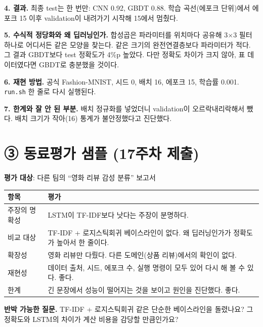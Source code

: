 \documentclass[11pt]{article}
\begin{document}
\noindent\textbf{4. 결과.} 최종 test는 한 번만: CNN 0.92, GBDT 0.88. 학습 곡선(에포크 단위)에서 에포크 15 이후 validation이 내려가기 시작해 15에서 멈췄다.

\noindent\textbf{5. 수식적 정당화와 왜 딥러닝인가.} 합성곱은 파라미터를 위치마다 공유해 3$\times$3 필터 하나로 어디서든 같은 모양을 찾는다. 같은 크기의 완전연결층보다 파라미터가 적다. 그 결과 GBDT보다 test 정확도가 4\%p 높았다. 다만 정확도 차이가 크지 않아, 표 데이터였다면 GBDT로 충분했을 것이다.

\noindent\textbf{6. 재현 방법.} 공식 Fashion-MNIST, 시드 0, 배치 16, 에포크 15, 학습률 0.001. \texttt{run.sh} 한 줄로 다시 실행된다.

\noindent\textbf{7. 한계와 잘 안 된 부분.} 배치 정규화를 넣었더니 validation이 오르락내리락해서 뺐다. 배치 크기가 작아(16) 통계가 불안정했다고 진단했다.

\newpage
\section*{③ 동료평가 샘플 (17주차 제출)}
\noindent\textbf{평가 대상}: 다른 팀의 ``영화 리뷰 감성 분류'' 보고서

\begin{center}\small
\begin{tabular}{@{}p{3.4cm}p{9cm}@{}}\toprule
항목 & 평가 \\\midrule
주장의 명확성 & LSTM이 TF-IDF보다 낫다는 주장이 분명하다. \\
비교 대상 & TF-IDF + 로지스틱회귀 베이스라인이 없다. 왜 딥러닝인가가 정확도가 높아서 한 줄이다. \\
확장성 & 영화 리뷰만 다뤘다. 다른 도메인(상품 리뷰)에서의 확인이 없다. \\
재현성 & 데이터 출처, 시드, 에포크 수, 실행 명령이 모두 있어 다시 해 볼 수 있다. 좋다. \\
한계 & 긴 문장에서 성능이 떨어지는 것을 보이고 원인을 진단했다. 좋다. \\
\bottomrule\end{tabular}\end{center}

\noindent\textbf{반박 가능한 질문.} TF-IDF + 로지스틱회귀 같은 단순한 베이스라인을 돌렸나요? 그 정확도와 LSTM의 차이가 계산 비용을 감당할 만큼인가요?
\end{document}
